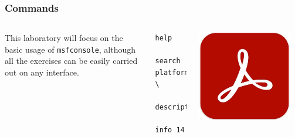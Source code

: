 \documentclass[handout]{beamer}
\begin{document}
\begin{frame}[fragile]
	\frametitle{Commands}

	\begin{columns}
		This laboratory will focus on the basic usage of \texttt{msfconsole}, although all the exercises can be easily carried out on any interface.
		\begin{lstlisting}
help

search platform:windows \
    description:acrobat

info 14
        \end{lstlisting}
		\centering
		\includegraphics[width=0.9\textwidth]{../drawable/decorations/image-acrobat.jpg}
	\end{columns}

\end{frame}
\end{document}
